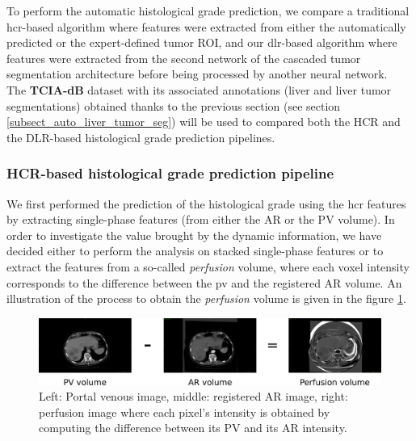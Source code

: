 \documentclass[]{article}
\newcommand{\lmttfont}[1]{{\fontfamily{lmtt}\selectfont #1}}
\begin{document}
To perform the automatic histological grade prediction, we compare a traditional \ac{hcr}-based algorithm where features were extracted from either the automatically predicted or the expert-defined tumor ROI, and our \ac{dlr}-based algorithm where features were extracted from the second network of the cascaded tumor segmentation architecture before being processed by another neural network.\\
The \textbf{\lmttfont{TCIA-dB}} dataset with its associated annotations (liver and liver tumor segmentations) obtained thanks to the previous section (see section \ref{subsect_auto_liver_tumor_seg}) will be used to compared both the HCR and the DLR-based histological grade prediction pipelines.


\subsubsection{HCR-based histological grade prediction pipeline}\label{hcr-based_method}

We first performed the prediction of the histological grade using the \ac{hcr} features by extracting single-phase features (from either the AR or the PV volume).
In order to investigate the value brought by the dynamic information, we have decided either to perform the analysis on stacked single-phase features or to extract the features from a so-called \textit{perfusion} volume, where each voxel intensity corresponds to the difference between the \ac{pv} and the registered AR volume. An illustration of the process to obtain the \textit{perfusion} volume is given in the figure \ref{fig:perfusion}.

\begin{figure}
	\centering
	\includegraphics[width=0.9\linewidth]{../Contributions/images/perfusion}
	\caption{Left: Portal venous image, middle: registered AR image, right: perfusion image where each pixel's intensity is obtained by computing the difference between its PV and its AR intensity.}
	\label{fig:perfusion}
\end{figure}
\end{document}

